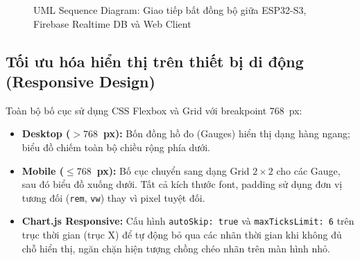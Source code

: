 \documentclass[12pt,a4paper]{article}
\begin{document}
\begin{figure}[H]
{
}
\caption{UML Sequence Diagram: Giao tiếp bất đồng bộ giữa ESP32-S3, Firebase Realtime DB và Web Client}
\label{fig:sequence_flow}
\end{figure}

\subsection{Tối ưu hóa hiển thị trên thiết bị di động (Responsive Design)}

Toàn bộ bố cục sử dụng CSS Flexbox và Grid với breakpoint $768$~px:

\begin{itemize}
    \item \textbf{Desktop ($>768$~px):} Bốn đồng hồ đo (Gauges) hiển thị dạng hàng ngang; biểu đồ chiếm toàn bộ chiều rộng phía dưới.
    \item \textbf{Mobile ($\leq768$~px):} Bố cục chuyển sang dạng Grid $2 \times 2$ cho các Gauge, sau đó biểu đồ xuống dưới. Tất cả kích thước font, padding sử dụng đơn vị tương đối (\texttt{rem}, \texttt{vw}) thay vì pixel tuyệt đối.
    \item \textbf{Chart.js Responsive:} Cấu hình \texttt{autoSkip: true} và \texttt{maxTicksLimit: 6} trên trục thời gian (trục X) để tự động bỏ qua các nhãn thời gian khi không đủ chỗ hiển thị, ngăn chặn hiện tượng chồng chéo nhãn trên màn hình nhỏ.
\end{itemize}
\end{document}

